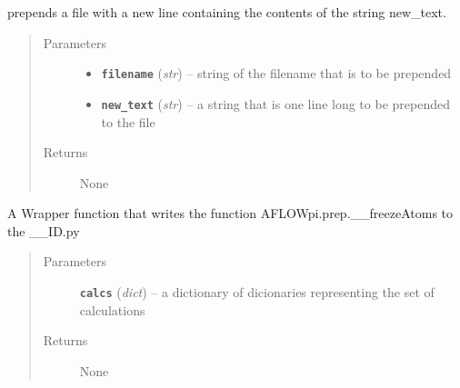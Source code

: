 \documentclass[letterpaper,10pt,english]{sphinxmanual}
\begin{document}

\begin{fulllineitems}
\label{prep:prep.line_prepender}
prepends a file with a new line containing the contents of the string new\_text.
\begin{quote}\begin{description}
\item[{Parameters}] \leavevmode\begin{itemize}
\item {} 
\textbf{\texttt{filename}} (\emph{str}) -- string of the filename that is to be prepended

\item {} 
\textbf{\texttt{new\_text}} (\emph{str}) -- a string that is one line long to be prepended to the file

\end{itemize}

\item[{Returns}] \leavevmode
None

\end{description}\end{quote}

\end{fulllineitems}


\begin{fulllineitems}
\label{prep:prep.loadlogs}
\end{fulllineitems}


\begin{fulllineitems}
\label{prep:prep.lockAtomMovement}
A Wrapper function that writes the function AFLOWpi.prep.\_\_freezeAtoms to the \_\_ID.py
\begin{quote}\begin{description}
\item[{Parameters}] \leavevmode
\textbf{\texttt{calcs}} (\emph{dict}) -- a dictionary of dicionaries representing the set of calculations

\item[{Returns}] \leavevmode
None

\end{description}\end{quote}

\end{fulllineitems}
\end{document}
